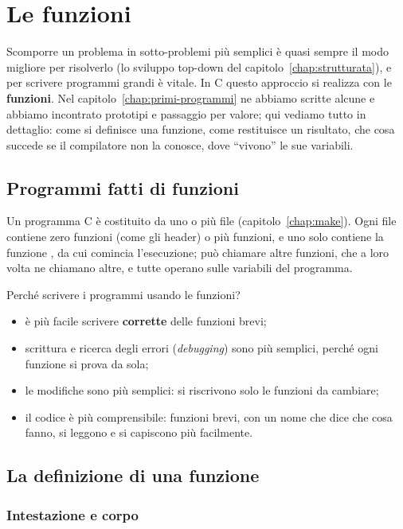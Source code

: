 \chapter{Le funzioni}
\label{chap:funzioni}

Scomporre un problema in sotto-problemi più semplici è quasi sempre il modo
migliore per risolverlo (lo sviluppo top-down del
capitolo~\ref{chap:strutturata}), e per scrivere programmi grandi è vitale.
In C questo approccio si realizza con le \textbf{funzioni}. Nel
capitolo~\ref{chap:primi-programmi} ne abbiamo scritte alcune e abbiamo
incontrato prototipi e passaggio per valore; qui vediamo tutto in dettaglio:
come si definisce una funzione, come restituisce un risultato, che cosa
succede se il compilatore non la conosce, dove “vivono” le sue variabili.

\section{Programmi fatti di funzioni}

Un programma C è costituito da uno o più file (capitolo~\ref{chap:make}).
Ogni file contiene zero funzioni (come gli header) o più funzioni, e uno
solo contiene la funzione , da cui comincia l'esecuzione;
 può chiamare altre funzioni, che a loro volta ne chiamano altre,
e tutte operano sulle variabili del programma.

Perché scrivere i programmi usando le funzioni?

\begin{itemize}
  \item è più facile scrivere \textbf{corrette} delle funzioni brevi;
  \item scrittura e ricerca degli errori (\textit{debugging}) sono più
        semplici, perché ogni funzione si prova da sola;
  \item le modifiche sono più semplici: si riscrivono solo le funzioni da
        cambiare;
  \item il codice è più comprensibile: funzioni brevi, con un nome che dice
        che cosa fanno, si leggono e si capiscono più facilmente.
\end{itemize}

\section{La definizione di una funzione}

\subsection{Intestazione e corpo}

